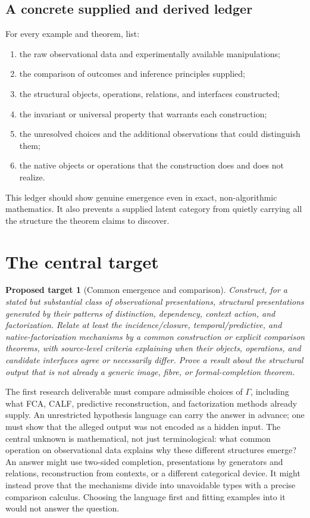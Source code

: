 \documentclass[11pt]{article}
\newtheorem{target}[definition]{Proposed target}
\theoremstyle{remark}
\begin{document}
\subsection{A concrete supplied and derived ledger}

For every example and theorem, list:
\begin{enumerate}
\item the raw observational data and experimentally available manipulations;
\item the comparison of outcomes and inference principles supplied;
\item the structural objects, operations, relations, and interfaces constructed;
\item the invariant or universal property that warrants each construction;
\item the unresolved choices and the additional observations that could distinguish them;
\item the native objects or operations that the construction does and does not realize.
\end{enumerate}
This ledger should show genuine emergence even in exact, non-algorithmic mathematics. It also prevents a supplied latent category from quietly carrying all the structure the theorem claims to discover.

\section{The central target}
\label{sec:central}

\begin{target}[Common emergence and comparison]
\label{target:central}
Construct, for a stated but substantial class of observational presentations, structural presentations generated by their patterns of distinction, dependency, context action, and factorization. Relate at least the incidence/closure, temporal/predictive, and native-factorization mechanisms by a common construction or explicit comparison theorems, with source-level criteria explaining when their objects, operations, and candidate interfaces agree or necessarily differ. Prove a result about the structural output that is not already a generic image, fibre, or formal-completion theorem.
\end{target}

The first research deliverable must compare admissible choices of $\Gamma$, including what FCA, CALF, predictive reconstruction, and factorization methods already supply. An unrestricted hypothesis language can carry the answer in advance; one must show that the alleged output was not encoded as a hidden input. The central unknown is mathematical, not just terminological: what common operation on observational data explains why these different structures emerge? An answer might use two-sided completion, presentations by generators and relations, reconstruction from contexts, or a different categorical device. It might instead prove that the mechanisms divide into unavoidable types with a precise comparison calculus. Choosing the language first and fitting examples into it would not answer the question.
\end{document}
